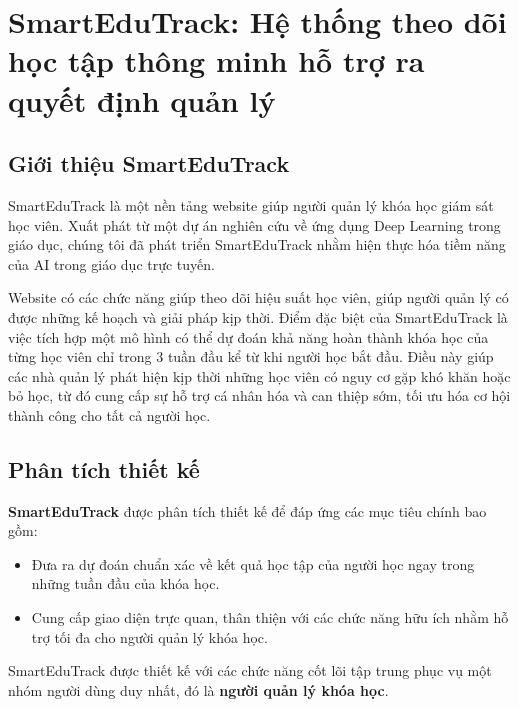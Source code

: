 \chapter{SmartEduTrack: Hệ thống theo dõi học tập thông minh hỗ trợ ra quyết định quản lý}
\label{chap:chap6}
\section{Giới thiệu SmartEduTrack}
SmartEduTrack là một nền tảng website giúp người quản lý khóa học giám sát học viên. Xuất phát từ một dự án nghiên cứu về ứng dụng Deep Learning trong giáo dục, chúng tôi đã phát triển SmartEduTrack nhằm hiện thực hóa tiềm năng của AI trong giáo dục trực tuyến.

Website có các chức năng giúp theo dõi hiệu suất học viên, giúp người quản lý có được những kế hoạch và giải pháp kịp thời. Điểm đặc biệt của SmartEduTrack là việc tích hợp một mô hình có thể dự đoán khả năng hoàn thành khóa học của từng học viên chỉ trong 3 tuần đầu kể từ khi người học bắt đầu. Điều này giúp các nhà quản lý phát hiện kịp thời những học viên có nguy cơ gặp khó khăn hoặc bỏ học, từ đó cung cấp sự hỗ trợ cá nhân hóa và can thiệp sớm, tối ưu hóa cơ hội thành công cho tất cả người học.
\section{Phân tích thiết kế}
 \textbf{SmartEduTrack} được phân tích thiết kế để đáp ứng các mục tiêu chính bao gồm:

\begin{itemize}
    \item Đưa ra dự đoán chuẩn xác về kết quả học tập của người học ngay trong những tuần đầu của khóa học.
    \item Cung cấp giao diện trực quan, thân thiện với các chức năng hữu ích nhằm hỗ trợ tối đa cho người quản lý khóa học.

\end{itemize}

SmartEduTrack được thiết kế với các chức năng cốt lõi tập trung phục vụ một nhóm người dùng duy nhất, đó là \textbf{người quản lý khóa học}.

